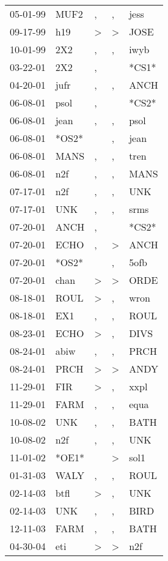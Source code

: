 \begin{supertabular}{lllll}
 05-01-99 &   MUF2 &             , &             , &   jess \\
 09-17-99 &    h19 &  \textgreater &  \textgreater &   JOSE \\
 10-01-99 &    2X2 &             , &             , &   iwyb \\
 03-22-01 &    2X2 &             , &               &  *CS1* \\
 04-20-01 &   jufr &             , &             , &   ANCH \\
 06-08-01 &   psol &             , &               &  *CS2* \\
 06-08-01 &   jean &             , &             , &   psol \\
 06-08-01 &  *OS2* &               &             , &   jean \\
 06-08-01 &   MANS &             , &             , &   tren \\
 06-08-01 &    n2f &             , &             , &   MANS \\
 07-17-01 &    n2f &             , &             , &    UNK \\
 07-17-01 &    UNK &             , &             , &   srms \\
 07-20-01 &   ANCH &             , &               &  *CS2* \\
 07-20-01 &   ECHO &             , &  \textgreater &   ANCH \\
 07-20-01 &  *OS2* &               &             , &   5ofb \\
 07-20-01 &   chan &  \textgreater &  \textgreater &   ORDE \\
 08-18-01 &   ROUL &  \textgreater &             , &   wron \\
 08-18-01 &    EX1 &             , &             , &   ROUL \\
 08-23-01 &   ECHO &  \textgreater &             , &   DIVS \\
 08-24-01 &   abiw &             , &             , &   PRCH \\
 08-24-01 &   PRCH &  \textgreater &  \textgreater &   ANDY \\
 11-29-01 &    FIR &  \textgreater &             , &   xxpl \\
 11-29-01 &   FARM &             , &             , &   equa \\
 10-08-02 &    UNK &             , &             , &   BATH \\
 10-08-02 &    n2f &             , &             , &    UNK \\
 11-01-02 &  *OE1* &               &  \textgreater &   sol1 \\
 01-31-03 &   WALY &             , &             , &   ROUL \\
 02-14-03 &   btfl &  \textgreater &             , &    UNK \\
 02-14-03 &    UNK &             , &             , &   BIRD \\
 12-11-03 &   FARM &             , &             , &   BATH \\
 04-30-04 &    eti &  \textgreater &  \textgreater &    n2f \\
\end{supertabular}
